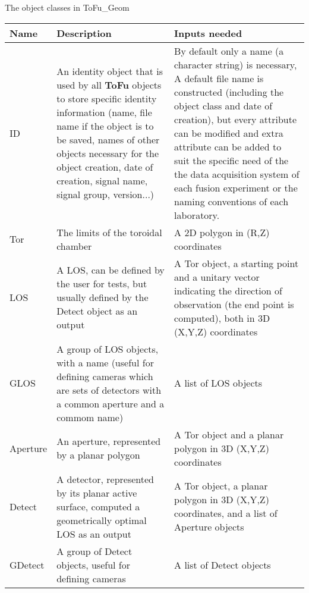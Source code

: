 \documentclass[letterpaper,10pt,english]{sphinxmanual}
\begin{document}
\begin{threeparttable}
\capstart\caption{The object classes in ToFu\_Geom}

\begin{tabulary}{\linewidth}{|L|L|L|}
\hline
\textbf{
Name
} & \textbf{
Description
} & \textbf{
Inputs needed
}\\\hline

ID
 & 
An identity object that is used by all \textbf{ToFu} objects to store specific identity information (name, file name if the object is to be saved, names of other objects necessary for the object creation, date of creation, signal name, signal group, version...)
 & 
By default only a name (a character string) is necessary, A default file name is constructed (including the object class and date of creation), but every attribute can be modified and extra attribute can be added to suit the specific need of the the data acquisition system of each fusion experiment or the naming conventions of each laboratory.
\\\hline

Tor
 & 
The limits of the toroidal chamber
 & 
A 2D polygon in (R,Z) coordinates
\\\hline

LOS
 & 
A LOS, can be defined by the user for tests, but usually defined by the Detect object as an output
 & 
A Tor object, a starting point and a unitary vector indicating the direction of observation (the end point is computed), both in 3D (X,Y,Z) coordinates
\\\hline

GLOS
 & 
A group of LOS objects, with a name (useful for defining cameras which are sets of detectors with a common aperture and a commom name)
 & 
A list of LOS objects
\\\hline

Aperture
 & 
An aperture, represented by a planar polygon
 & 
A Tor object and a planar polygon in 3D (X,Y,Z) coordinates
\\\hline

Detect
 & 
A detector, represented by its planar active surface, computed a geometrically optimal LOS as an output
 & 
A Tor object, a planar polygon in 3D (X,Y,Z) coordinates, and a list of Aperture objects
\\\hline

GDetect
 & 
A group of Detect objects, useful for defining cameras
 & 
A list of Detect objects
\\\hline
\end{tabulary}

\end{threeparttable}
\end{document}
